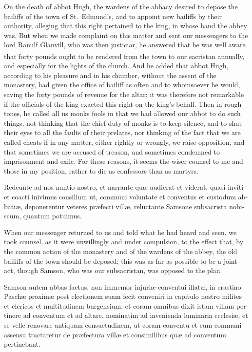 \documentclass[10pt]{book}
\newcounter{engnote}
\newcommand{\engnotenum}{\textsuperscript{\arabic{engnote}\stepcounter{engnote}}}
\begin{document}
\begin{paracol}{2}
On the death of abbot Hugh, the wardens of the abbacy desired to depose the bailiffs of the town of St.\ Edmund's, and to appoint new bailiffs by their authority, alleging that this right pertained to the king, in whose hand the abbey was. But when we made complaint on this matter and sent our messengers to the lord Ranulf Glanvill, who was then justiciar, he answered that he was well aware that forty pounds ought to be rendered from the town\engnotenum{} to our sacristan annually, and especially for the lights of the church. And he added that abbot Hugh, according to his pleasure and in his chamber, without the assent of the monastery, had given the office of bailiff as often and to whomsoever he would, saving the forty pounds of revenue for the altar; it was therefore not remarkable if the officials of the king exacted this right on the king's behalf. Then in rough tones, he called all us monks fools in that we had allowed our abbot to do such things, not thinking that the chief duty of monks is to keep silence, and to shut their eyes to all the faults of their prelates, nor thinking of the fact that we are called cheats if in any matter, either rightly or wrongly, we raise opposition, and that sometimes we are accused of treason, and sometimes condemned to imprisonment and exile. For these reasons, it seems the wiser counsel to me and those in my position, rather to die as confessors than as martyrs.

\switchcolumn*

\begin{otherlanguage}{latin}
Redeunte ad nos nuntio nostro, et narrante qu\ae{} audierat et viderat, quasi inviti et coacti inivimus consilium ut, communi voluntate et conventus et custodum abbati\ae{}, deponerentur veteres pr\ae{}fecti vill\ae{}, reluctante Samsone subsacrista nobiscum, quantum potuimus.
\end{otherlanguage}

\switchcolumn

When our messenger returned to us and told what he had heard and seen, we took counsel, as it were unwillingly and under compulsion, to the effect that, by the common action of the monastery and of the wardens of the abbey, the old bailiffs of the town should be deposed; this was as far as possible to be a joint act, though Samson, who was our subsacristan, was opposed to the plan.

\switchcolumn*

\begin{otherlanguage}{latin}
Samson autem abbas factus, non immemor injuri\ae{} conventui illat\ae{}, in crastino Pasch\ae{} proxim\ae{} post electionem suam fecit conveniri in capitulo nostro milites et clericos et multitudinem burgensium, et coram omnibus dixit istam villam pertinere ad conventum et ad altare, nominatim ad invenienda luminaria ecclesi\ae{}; et se velle renovare antiquam consuetudinem, ut coram conventu et cum communi assensu tractaretur de pr\ae{}fectura vill\ae{} et consimilibus qu\ae{} ad conventum pertinebant. 
\end{otherlanguage}


\end{paracol}
\end{document}
